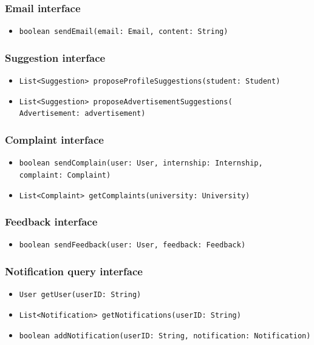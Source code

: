 \subsubsection{Email interface}
\begin{itemize}
    \item \verb|boolean sendEmail(email: Email, content: String)|
\end{itemize}

\subsubsection{Suggestion interface}
\begin{itemize}
    \item \verb|List<Suggestion> proposeProfileSuggestions(student: Student)|
    \item \verb|List<Suggestion> proposeAdvertisementSuggestions(| \\ \makebox[10em][l]{} \verb|Advertisement: advertisement)|
\end{itemize}

\subsubsection{Complaint interface}
\begin{itemize}
    \item \verb|boolean sendComplain(user: User, internship: Internship, | \\ \makebox[10em][l]{} \verb|complaint: Complaint)|
    \item \verb|List<Complaint> getComplaints(university: University)|
\end{itemize}

\subsubsection{Feedback interface}
\begin{itemize}
    \item \verb|boolean sendFeedback(user: User, feedback: Feedback)|
\end{itemize}

\subsubsection{Notification query interface}
\begin{itemize}
    \item \verb|User getUser(userID: String)|
    \item \verb|List<Notification> getNotifications(userID: String)|
    \item \verb|boolean addNotification(userID: String, notification: Notification)|
\end{itemize}

